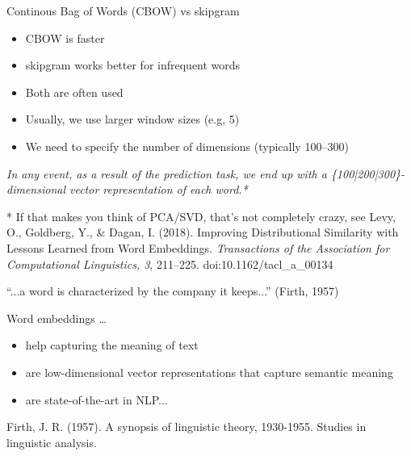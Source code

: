 \documentclass[compress]{beamer}
\begin{document}
\begin{frame}{Continous Bag of Words (CBOW) vs skipgram}
	\begin{itemize}
		\item CBOW is faster
		\item skipgram works better for infrequent words
		\item Both are often used
		\item Usually, we use larger window sizes (e.g, 5)
		\item We need to specify the number of dimensions (typically 100--300)
	\end{itemize}
	\pause
	
	\textit{In any event, as a result of the prediction task, we end up with a \{100|200|300\}-dimensional vector representation of each word.*}
	
	
	
	\tiny{* If that makes you think of PCA/SVD, that's not completely crazy, see Levy, O., Goldberg, Y., \& Dagan, I. (2018). Improving Distributional Similarity with Lessons Learned from Word Embeddings. \textit{Transactions of the Association for Computational Linguistics, 3}, 211--225. doi:10.1162/tacl\_a\_00134}\\
\end{frame}




\begin{frame}{``...a word is characterized by the company it keeps...'' (Firth, 1957)}
	\begin{block}{Word embeddings \ldots}
		\begin{itemize}
			\item help capturing the meaning of text
			\item are low-dimensional vector representations that capture semantic meaning
			\item are state-of-the-art in NLP...
		\end{itemize}
	\end{block}
	
	\tiny{Firth, J. R. (1957). A synopsis of linguistic theory, 1930-1955. Studies in linguistic analysis.}
\end{frame}

\end{document}

